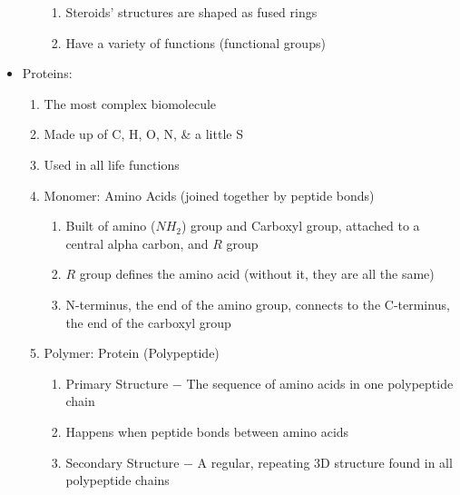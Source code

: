 \documentclass[12pt]{article}
\begin{document}
\begin{itemize}
\begin{enumerate}
\begin{enumerate}
          \item Steroids' structures are shaped as fused rings

          \item Have a variety of functions (functional groups)

        \end{enumerate}

    \end{enumerate}

  \item Proteins:

    \begin{enumerate}

      \item The most complex biomolecule

      \item Made up of C, H, O, N, \& a little S

      \item Used in all life functions

      \item Monomer: Amino Acids (joined together by peptide bonds)

        \begin{enumerate}

          \item Built of amino ($NH_2$) group and Carboxyl group, attached to a central alpha carbon, and $R$ group

          \item $R$ group defines the amino acid (without it, they are all the same)

          \item N-terminus, the end of the amino group, connects to the C-terminus, the end of the carboxyl group


        \end{enumerate}

      \item Polymer: Protein (Polypeptide)

        \begin{enumerate}

          \item Primary Structure $-$ The sequence of amino acids in one polypeptide chain

          \item Happens when peptide bonds between amino acids

          \item Secondary Structure $-$ A regular, repeating 3D structure found in all polypeptide chains


\end{enumerate}
\end{enumerate}
\end{itemize}
\end{document}
